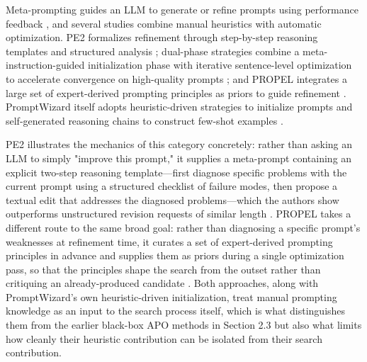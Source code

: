\documentclass[a4paper,fleqn]{cas-sc}
\begin{document}
Meta-prompting guides an LLM to generate or refine prompts using performance feedback \citep{cui2025}, and several studies combine manual heuristics with automatic optimization. PE2 formalizes refinement through step-by-step reasoning templates and structured analysis \citep{ye2024}; dual-phase strategies combine a meta-instruction-guided initialization phase with iterative sentence-level optimization to accelerate convergence on high-quality prompts \citep{yang2024b}; and PROPEL integrates a large set of expert-derived prompting principles as priors to guide refinement \citep{mayilvaghanan2025}. PromptWizard itself adopts heuristic-driven strategies to initialize prompts and self-generated reasoning chains to construct few-shot examples \citep{agarwal2025}.

PE2 illustrates the mechanics of this category concretely: rather than asking an LLM to simply "improve this prompt," it supplies a meta-prompt containing an explicit two-step reasoning template---first diagnose specific problems with the current prompt using a structured checklist of failure modes, then propose a textual edit that addresses the diagnosed problems---which the authors show outperforms unstructured revision requests of similar length \citep{ye2024}. PROPEL takes a different route to the same broad goal: rather than diagnosing a specific prompt's weaknesses at refinement time, it curates a set of expert-derived prompting principles in advance and supplies them as priors during a single optimization pass, so that the principles shape the search from the outset rather than critiquing an already-produced candidate \citep{mayilvaghanan2025}. Both approaches, along with PromptWizard's own heuristic-driven initialization, treat manual prompting knowledge as an input to the search process itself, which is what distinguishes them from the earlier black-box APO methods in Section 2.3 but also what limits how cleanly their heuristic contribution can be isolated from their search contribution.
\end{document}
